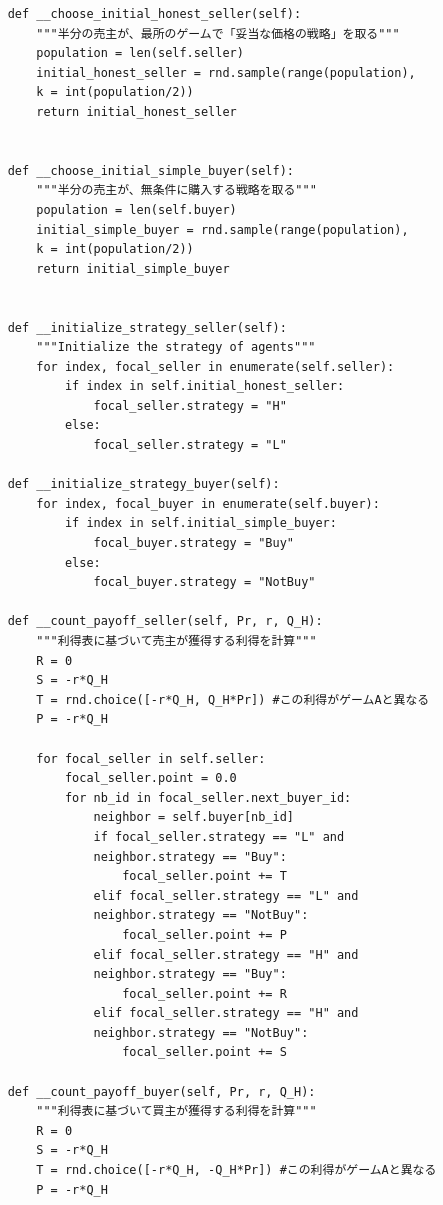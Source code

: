 \documentclass[a4paper,fontsize=11pt,report,notitlepage,line_length=38zw,number_of_lines=40,dvipdfmx]{jlreq}
\begin{document}
\begin{lstlisting}
    def __choose_initial_honest_seller(self):
        """半分の売主が、最所のゲームで「妥当な価格の戦略」を取る"""
        population = len(self.seller)
        initial_honest_seller = rnd.sample(range(population), 
        k = int(population/2))
        return initial_honest_seller


    def __choose_initial_simple_buyer(self):
        """半分の売主が、無条件に購入する戦略を取る"""
        population = len(self.buyer)
        initial_simple_buyer = rnd.sample(range(population), 
        k = int(population/2))
        return initial_simple_buyer
        

    def __initialize_strategy_seller(self):
        """Initialize the strategy of agents"""
        for index, focal_seller in enumerate(self.seller):
            if index in self.initial_honest_seller:
                focal_seller.strategy = "H"
            else:
                focal_seller.strategy = "L"

    def __initialize_strategy_buyer(self):
        for index, focal_buyer in enumerate(self.buyer):
            if index in self.initial_simple_buyer:
                focal_buyer.strategy = "Buy"
            else:
                focal_buyer.strategy = "NotBuy"

    def __count_payoff_seller(self, Pr, r, Q_H):
        """利得表に基づいて売主が獲得する利得を計算"""
        R = 0
        S = -r*Q_H
        T = rnd.choice([-r*Q_H, Q_H*Pr]) #この利得がゲームAと異なる
        P = -r*Q_H

        for focal_seller in self.seller:
            focal_seller.point = 0.0
            for nb_id in focal_seller.next_buyer_id:
                neighbor = self.buyer[nb_id]
                if focal_seller.strategy == "L" and 
                neighbor.strategy == "Buy":
                    focal_seller.point += T
                elif focal_seller.strategy == "L" and 
                neighbor.strategy == "NotBuy":
                    focal_seller.point += P
                elif focal_seller.strategy == "H" and 
                neighbor.strategy == "Buy":
                    focal_seller.point += R
                elif focal_seller.strategy == "H" and 
                neighbor.strategy == "NotBuy":  
                    focal_seller.point += S
    
    def __count_payoff_buyer(self, Pr, r, Q_H):
        """利得表に基づいて買主が獲得する利得を計算"""
        R = 0
        S = -r*Q_H
        T = rnd.choice([-r*Q_H, -Q_H*Pr]) #この利得がゲームAと異なる
        P = -r*Q_H


\end{lstlisting}
\end{document}
